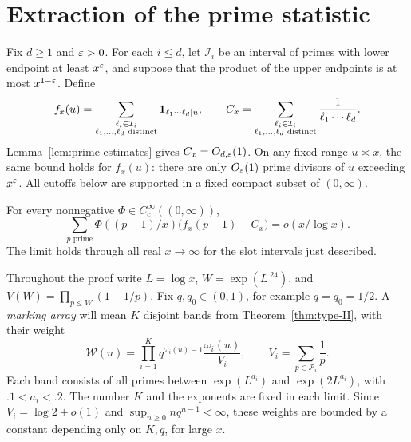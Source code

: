\section{Extraction of the prime statistic}
\label{ext:section}

Fix $d\geq1$ and $\varepsilon>0$.  For each $i\leq d$, let
$\mathcal I_i$ be an interval of primes with lower endpoint at least
$x^\varepsilon$, and suppose that the product of the upper endpoints is
at most $x^{1-\varepsilon}$.  Define
\begin{equation}\label{ext:statistic}
 f_x(u)=\sum_{\substack{\ell_i\in\mathcal I_i\\
                         \ell_1,\ldots,\ell_d\text{ distinct}}}
                   \mathbf{1}_{\ell_1\cdots\ell_d\mid u},\qquad
 C_x=\sum_{\substack{\ell_i\in\mathcal I_i\\
                         \ell_1,\ldots,\ell_d\text{ distinct}}}
                   \frac1{\ell_1\cdots\ell_d}.
\end{equation}
Lemma~\ref{lem:prime-estimates} gives $C_x=O_{d,\varepsilon}(1)$.
On any fixed range $u\asymp x$, the same bound holds for $f_x(u)$:
there are only $O_\varepsilon(1)$ prime divisors of $u$ exceeding
$x^\varepsilon$.  All cutoffs below are supported in a fixed compact
subset of $(0,\infty)$.

\begin{theorem}\label{thm:interior}
For every nonnegative $\Phi\in C_c^\infty((0,\infty))$,
\begin{equation}\label{eq:interior}
 \sum_{p\text{ prime}}\Phi((p-1)/x)
                   \bigl(f_x(p-1)-C_x\bigr)=o(x/\log x).
\end{equation}
The limit holds through all real $x\to\infty$ for the slot
intervals just described.
\end{theorem}

Throughout the proof write $L=\log x$, $W=\exp(L^{.24})$, and
$V(W)=\prod_{p\leq W}(1-1/p)$.  Fix $q,q_0\in(0,1)$, for
example $q=q_0=1/2$.  A \emph{marking array} will mean $K$ disjoint
bands from Theorem~\ref{thm:type-II}, with their weight
\begin{equation}\label{ext:array-weight}
 \mathcal W(u)=\prod_{i=1}^K
          q^{\omega_i(u)-1}\frac{\omega_i(u)}{V_i},\qquad
 V_i=\sum_{p\in\mathcal P_i}\frac1p.
\end{equation}
Each band consists of all primes between $\exp(L^{a_i})$ and
$\exp(2L^{a_i})$, with $.1<a_i<.2$.  The number $K$ and the
exponents are fixed in each limit.  Since $V_i=\log2+o(1)$ and
$\sup_{n\geq0}nq^{n-1}<\infty$, these weights are bounded by a
constant depending only on $K,q$, for large $x$.

